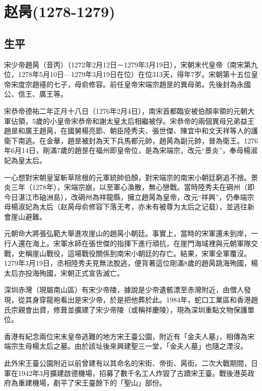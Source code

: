 
\section{赵昺\tiny(1278-1279)}


\subsection{生平}

宋少帝趙昺（音丙）（1272年2月12日－1279年3月19日），宋朝末代皇帝（南宋第九位，1278年5月10日—1279年3月19日在位）在位313天，得年7岁。宋朝第十五位皇帝宋度宗趙禥的七子，母俞修容。前任皇帝宋端宗趙昰的異母弟。先後封為永國公、信王、廣王等。

宋恭帝德祐二年正月十八日（1276年2月4日），南宋首都臨安被伯顏率領的元朝大軍佔領，5歲的小皇帝宋恭帝和謝太皇太后相繼被俘。宋恭帝的兩個異母兄弟益王趙昰和廣王趙昺，在國舅楊亮節、朝臣陸秀夫、張世傑、陳宜中和文天祥等人的護衛下南逃。在金華，趙昰被封為天下兵馬都元帥，趙昺為副元帥，晉為衛王。1276年6月14日，剛滿7歲的趙昰在福州即皇帝位，是為宋端宗，改元“景炎”，奉母楊淑妃為皇太后。

一心想對宋朝皇室斬草除根的元軍統帥伯顏，對宋端宗的南宋小朝廷窮追不捨。景炎三年（1278年），宋端宗崩，以至軍心渙散，無心戀戰。當時陸秀夫在碙州（即今日湛江市硇洲島），改碙州為祥龍縣，擁立趙昺為皇帝，改元“祥興”，仍奉端宗母楊淑妃為太后（赵昺母俞修容下落无考，亦未有被尊为太后之记载），並逃往新會崖山避難。

元朝命大將張弘範大舉進攻崖山的趙昺小朝廷。事實上，當時的宋軍還未到岸，一行人還在海上。宋軍水師在張世傑的指揮下進行頑抗，在崖門海域裡與元朝軍隊交戰，史稱崖山戰役，這場戰役關係到南宋小朝廷的存亡。結果，宋軍全軍覆沒。1279年3月19日，丞相陸秀夫見無法脫逃，便背著這位剛滿8歲的趙昺跳海殉國，楊太后亦投海殉國，宋朝正式宣告滅亡。

深圳赤灣（現屬南山區）有宋少帝陵，據說是少帝遺骸漂至赤灣附近，由僧人發現，從其身穿龍袍看出是宋少帝，於是把他葬於此。1984年，蛇口工業區和香港趙氏宗親會出資，修葺並擴建了宋少帝陵（或稱祥慶陵），現為深圳重點文物保護單位。

香港有紀念兩位宋末皇帝逃難的地方宋王臺公園，附近有「金夫人墓」，相傳為宋端宗生母楊太后之墓。由於該址後來興建聖三一堂，「金夫人墓」也隨之湮沒。

此外宋王臺公園附近以前曾建有以其命名的宋街、帝街、昺街。二次大戰期間，日軍在1942年3月擴建啟德機場，招募了數千名工人炸毀了古蹟宋王臺。戰後港英政府為重建機場，剷平了宋王臺餘下的「聖山」部份。

